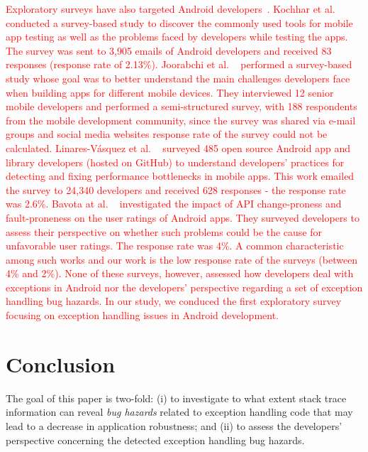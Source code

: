 \textcolor{red}{Exploratory surveys have also targeted Android developers~\cite{kochhar2015understanding,joorabchi2013real,bavota2015impact,linares2015developers}.
Kochhar et al. ~\cite{kochhar2015understanding} conducted a survey-based study to discover the
commonly used tools for mobile app testing as well as the problems
faced by developers while testing the apps. The survey was sent to 3,905 emails of Android developers
and received 83 responses (response rate of 2.13\%).
Joorabchi et al. ~\cite{joorabchi2013real} performed a survey-based study whose goal was to better understand the main challenges
developers face when building apps for different mobile devices.
They interviewed 12 senior mobile developers and performed a semi-structured survey, with 188 respondents
 from the mobile development community, since the survey was shared via e-mail groups and social media websites
response rate of the survey could not be calculated. Linares-Vásquez et al. ~\cite{linares2015developers} surveyed 485 open source Android
app and library developers (hosted on GitHub)  to understand developers’ practices for detecting and fixing
performance bottlenecks in mobile apps.  This work emailed the survey to 24,340 developers and received
628 responses - the response rate was 2.6\%.
Bavota at al. ~\cite{bavota2015impact} investigated the impact of API change-proness and fault-proneness on the user ratings of Android apps.
They surveyed developers to assess their perspective on whether such problems could be the cause for unfavorable user ratings.
The response rate was 4\%.
A common characteristic among such works and our work is the low response rate of the surveys (between 4\% and 2\%).
None of these surveys, however, assessed how developers deal with exceptions in Android nor
the developers' perspective regarding a set of exception handling bug hazards.
In our study,
we conduced the first exploratory survey focusing on exception handling issues in Android development.}


\section{Conclusion}
\label{sec:conc}

The goal of this paper is two-fold: (i) to investigate
to what extent stack trace information can reveal \emph{bug hazards}
related to exception handling code that may lead to a decrease in
application robustness; and (ii) to assess the developers' perspective
concerning the detected exception handling bug hazards.


